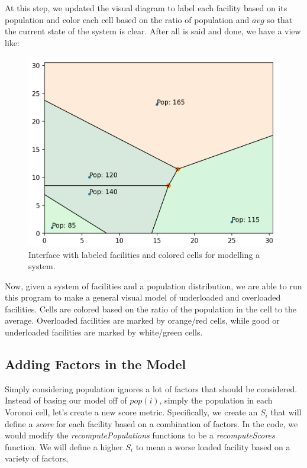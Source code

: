 \documentclass{article}
\begin{document}
At this step, we updated the visual diagram to label each facility based on its population and color each cell based on the ratio of population and $avg$ so that the current state of the system is clear. After all is said and done, we have a view like: 

\vspace{10pt}
\begin{figure}[h!]
    \centering
    \captionsetup{justification=centering}
    \includegraphics[clip,scale=0.24]{voronoi_draw_final.png}
    \caption{Interface with labeled facilities and colored cells for modelling a system.}
    \label{fig:final-interface}
\end{figure}
\vspace{10pt}

Now, given a system of facilities and a population distribution, we are able to run this program to make a general visual model of underloaded and overloaded facilities. Cells are colored based on the ratio of the population in the cell to the average. Overloaded facilities are marked by orange/red cells, while good or underloaded facilities are marked by white/green cells. 

\subsection{Adding Factors in the Model}
Simply considering population ignores a lot of factors that should be considered. Instead of basing our model off of $pop(i)$, simply the population in each Voronoi cell, let's create a new score metric. Specifically, we create an $S_i$ that will define a \textit{score} for each facility based on a combination of factors. In the code, we would modify the \textit{recomputePopulations} functions to be a \textit{recomputeScores} function. We will define a higher $S_i$ to mean a worse loaded facility based on a variety of factors, 
\end{document}
